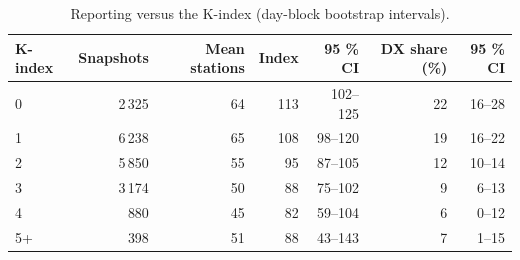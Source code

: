 \begin{table}[htbp]\centering\small
\caption{Reporting versus the K-index (day-block bootstrap intervals).}\label{tab:k}
\begin{tabular}{lrrrrrr}
\toprule
K-index & Snapshots & Mean stations & Index & 95 \% CI & DX share (\%) & 95 \% CI \\
\midrule
0 & 2\,325 & 64 & 113 & 102--125 & 22 & 16--28 \\
1 & 6\,238 & 65 & 108 & 98--120 & 19 & 16--22 \\
2 & 5\,850 & 55 & 95 & 87--105 & 12 & 10--14 \\
3 & 3\,174 & 50 & 88 & 75--102 & 9 & 6--13 \\
4 & 880 & 45 & 82 & 59--104 & 6 & 0--12 \\
5+ & 398 & 51 & 88 & 43--143 & 7 & 1--15 \\
\bottomrule
\end{tabular}
\end{table}
